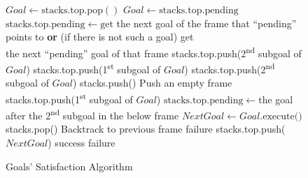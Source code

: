 \documentclass{ws-ijait}
\begin{document}
\begin{figure}
  \centering
  \begin{algorithmic}
          \State $\mathit{Goal} \gets
                  \mathrm{stacks.top.pop()}$
        \Else
          \State $\mathit{Goal} \gets
                  \mathrm{stacks.top.pending}$
          \State $\mathrm{stacks.top.pending} \gets
                 \textrm{get}$ the next goal of the frame
                 that ``pending'' \\ \hspace*{14em} points
                 to \textbf{or} (if there is not such a
                 goal) get \\ \hspace*{14em} the next
                 ``pending'' goal of that frame
        \EndIf
          \State stacks.top.push(2\textsuperscript{nd}
                 subgoal of $\mathit{Goal}$)
          \State stacks.top.push(1\textsuperscript{st}
                 subgoal of $\mathit{Goal}$)
          \State stacks.top.push(2\textsuperscript{nd}
                 subgoal of $\mathit{Goal}$)
          \State stacks.push() \Comment Push an empty frame
          \State stacks.top.push(1\textsuperscript{st}
                 subgoal of $\mathit{Goal}$)
          \State $\mathrm{stacks.top.pending} \gets
                 \textrm{the}$ goal after the
                 2\textsuperscript{nd} subgoal in the below
                 frame
        \Else
          \State $\mathit{NextGoal} \gets
                  \mathit{Goal}\textrm{.execute()}$
            \State stacks.pop()
            \Comment Backtrack to previous frame
              \State \Return failure
            \EndIf
            \State stacks.top.push($\mathit{NextGoal}$)
            \State \Return success
          \EndIf
        \EndIf
      \EndWhile
      \State \Return failure
    \EndFunction
  \end{algorithmic}
  \caption{Goals' Satisfaction Algorithm\label{solve}}
\end{figure}
\end{document}
